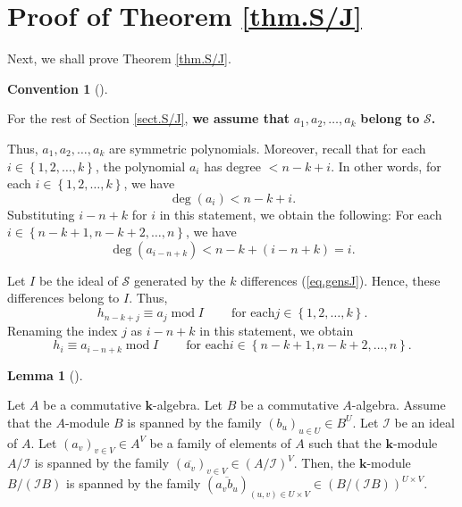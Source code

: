 \documentclass[numbers=enddot,12pt,final,onecolumn,notitlepage]{scrartcl}%
\theoremstyle{definition}
\newtheorem{lem}[theo]{Lemma}
\newenvironment{lemma}[1][]
{\begin{lem}[#1]\begin{leftbar}}
{\end{leftbar}\end{lem}}
\newtheorem{conv}[theo]{Convention}
\newenvironment{convention}[1][]
{\begin{conv}[#1]\begin{leftbar}}
{\end{leftbar}\end{conv}}
\newenvironment{convention}[1][Convention]{\noindent\textbf{#1.} }{\ \rule{0.5em}{0.5em}}
\newenvironment{convention}[1][Convention]{\noindent\textbf{#1.} }{\ \rule{0.5em}{0.5em}}
\begin{document}
\section{\label{sect.S/J}Proof of Theorem \ref{thm.S/J}}

Next, we shall prove Theorem \ref{thm.S/J}.

\begin{convention}
For the rest of Section \ref{sect.S/J}, \textbf{we assume that }$a_{1}%
,a_{2},\ldots,a_{k}$ \textbf{belong to }$\mathcal{S}$\textbf{.}
\end{convention}

Thus, $a_{1},a_{2},\ldots,a_{k}$ are symmetric polynomials. Moreover, recall
that for each $i\in\left\{  1,2,\ldots,k\right\}  $, the polynomial $a_{i}$
has degree $<n-k+i$. In other words, for each $i\in\left\{  1,2,\ldots
,k\right\}  $, we have%
\begin{equation}
\deg\left(  a_{i}\right)  <n-k+i. \label{eq.degai.1}%
\end{equation}
Substituting $i-n+k$ for $i$ in this statement, we obtain the following: For
each $i\in\left\{  n-k+1,n-k+2,\ldots,n\right\}  $, we have%
\begin{equation}
\deg\left(  a_{i-n+k}\right)  <n-k+\left(  i-n+k\right)  =i.
\label{eq.degan-k+i.1}%
\end{equation}


Let $I$ be the ideal of $\mathcal{S}$ generated by the $k$ differences
(\ref{eq.gensJ}). Hence, these differences belong to $I$. Thus,%
\begin{equation}
h_{n-k+j}\equiv a_{j}\operatorname{mod}I\ \ \ \ \ \ \ \ \ \ \text{for each
}j\in\left\{  1,2,\ldots,k\right\}  . \label{eq.h=amodI}%
\end{equation}
Renaming the index $j$ as $i-n+k$ in this statement, we obtain%
\begin{equation}
h_{i}\equiv a_{i-n+k}\operatorname{mod}I\ \ \ \ \ \ \ \ \ \ \text{for each
}i\in\left\{  n-k+1,n-k+2,\ldots,n\right\}  . \label{eq.h=amodI2}%
\end{equation}


\begin{lemma}
\label{lem.basis-over-basis}Let $A$ be a commutative $\mathbf{k}$-algebra. Let
$B$ be a commutative $A$-algebra. Assume that the $A$-module $B$ is spanned by
the family $\left(  b_{u}\right)  _{u\in U}\in B^{U}$. Let $\mathcal{I}$ be an
ideal of $A$. Let $\left(  a_{v}\right)  _{v\in V}\in A^{V}$ be a family of
elements of $A$ such that the $\mathbf{k}$-module $A/\mathcal{I}$ is spanned
by the family $\left(  \overline{a_{v}}\right)  _{v\in V}\in\left(
A/\mathcal{I}\right)  ^{V}$. Then, the $\mathbf{k}$-module $B/\left(
\mathcal{I}B\right)  $ is spanned by the family $\left(  \overline{a_{v}b_{u}%
}\right)  _{\left(  u,v\right)  \in U\times V}\in\left(  B/\left(
\mathcal{I}B\right)  \right)  ^{U\times V}$.
\end{lemma}
\end{document}
